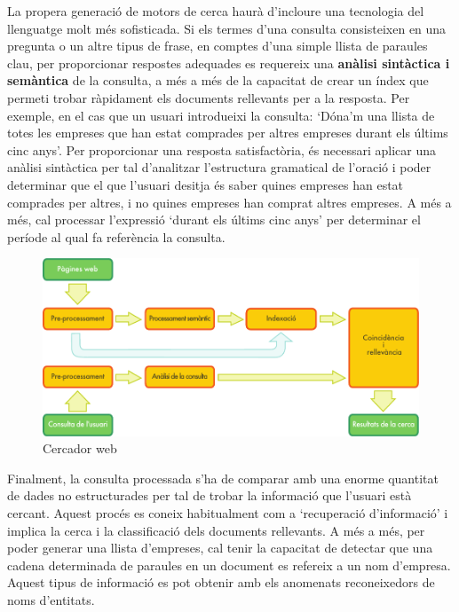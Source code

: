 \begin{multicols}{2}
La propera generació de motors de cerca haurà d’incloure una tecnologia del llenguatge molt més sofisticada. Si els termes d’una consulta consisteixen en una pregunta o un altre tipus de frase, en comptes d’una simple llista de paraules clau, per proporcionar respostes adequades es requereix una \textbf{anàlisi sintàctica i semàntica} de la consulta, a més  a més de la capacitat de crear un índex que permeti trobar ràpidament els documents rellevants per a la resposta. Per exemple, en el cas que un usuari introdueixi la consulta: ‘Dóna’m una llista de totes les empreses que han estat comprades per altres empreses durant els últims cinc anys’. Per proporcionar una resposta satisfactòria, és necessari aplicar una anàlisi sintàctica per tal d’analitzar l’estructura gramatical de l’oració i poder determinar que el que l’usuari desitja és saber quines empreses han estat comprades per altres, i no quines empreses han comprat altres empreses. A més a més, cal processar  l’expressió ‘durant els últims cinc anys’ per determinar el període al qual fa referència la consulta. 

\begin{figure}[htb]
  \vspace{-9mm}
  \center
  \includegraphics[width=\textwidth]{../_media/catalan/web_search_architecture}
  \vspace{-5mm}
  \caption{Cercador web}
  \label{fig:websearcharch_ca}
\end{figure}

Finalment, la consulta processada s’ha de comparar amb una enorme quantitat de dades no estructurades per tal de trobar la informació que l'usuari està cercant. Aquest procés es coneix habitualment com a ‘recuperació d'informació’ i implica la cerca i la classificació dels documents rellevants. A més a més, per poder generar una llista d’empreses, cal tenir la capacitat de detectar que una cadena determinada de paraules en un document es refereix a un nom d'empresa. Aquest tipus de informació es pot obtenir amb els anomenats reconeixedors de noms d’entitats.


\end{multicols}
